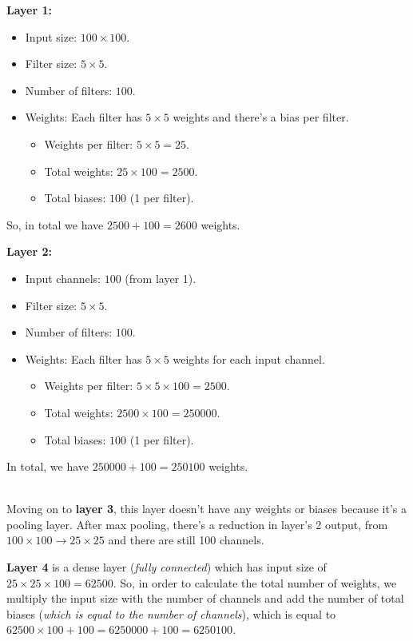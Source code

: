\begin{minipage}[l]{0.47\textwidth}
	\textbf{Layer 1:}
	\begin{itemize}
		\item Input size: $100 \times 100$.
		\item Filter size: $5 \times 5$.
		\item Number of filters: $100$.
		\item Weights: Each filter has $5 \times 5$ weights and there's a bias per filter.
		\begin{itemize}
			\item Weights per filter: $5 \times 5=25$.
			\item Total weights: $25\times 100=2500$.
			\item Total biases: $100$ (1 per filter).
		\end{itemize}
	\end{itemize}
	So, in total we have $2500 + 100 = 2600$ weights.
\end{minipage}
\hfil
\begin{minipage}[r]{0.47\textwidth}
	\textbf{Layer 2:}
	\begin{itemize}
		\item Input channels: $100$ (from layer 1).
		\item Filter size: $5 \times 5$.
		\item Number of filters: $100$.
		\item Weights: Each filter has $5 \times 5$ weights for each input channel.
		\begin{itemize}
			\item Weights per filter: $5 \times 5 \times 100 = 2500$.
			\item Total weights: $2500\times 100 = \num{250000}$.
			\item Total biases: $100$ (1 per filter).
		\end{itemize}
	\end{itemize}
	In total, we have $\num{250000} + 100 = \num{250100}$ weights.
\end{minipage} \\

Moving on to \textbf{layer 3}, this layer doesn't have any weights or biases because it's a pooling layer.
After max pooling, there's a reduction in layer's 2 output, from $100\times 100 \rightarrow 25\times 25$ and there are still 100 channels.

\textbf{Layer 4} is a dense layer (\textit{fully connected}) which has input size of $25 \times 25 \times 100 = 62500$. So, in order to calculate the total number of weights, we multiply the input size with the number of channels and add the number of total biases (\textit{which is equal to the number of channels}), which is equal to $62500 \times 100 +100 = \num{6250000} + 100 = \num{6250100} $.

